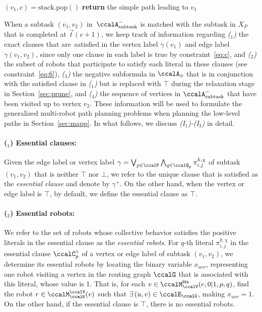 \documentclass[Afour,sageh,times]{sagej}
\newcounter{mycounter}
\newcommand{\clause}[1]{\mathsf{cls}(#1)}
\newcommand{\auto}[1]{\ccalA_{\textup{#1}}}
\newcommand{\autop}{\ccalA_{\phi}}
\renewcommand{\ap}[3]{\mathcal{\pi}_{{#1},{#2}}^{#3}}
\begin{document}
{{\begin{algorithm}[t]
{{{             }
           }
           $(v_1, c) = \text{stack.pop}()$\;
           }
           {\bf return} the simple path leading to $v_1$\;

 \end{algorithm}
 When a subtask $(v_1, v_2)$ in~$\auto{subtask}^-$ is matched with the subtask in $X_P$ that is completed at $\vec{t}(c+1)$, we keep track of information regarding {\it ($_1$)} the exact clauses that are\ satisfied in the vertex label $\gamma(v_1)$  and edge label $\gamma(v_1, v_2)$, since only one clause in each label is true by constraint~\eqref{eq:c}, and {\it ($_2$)} the subset of robots that participate to satisfy each literal in these clauses (see constraint~\eqref{eq:6}),
 {\it ($_3$)} the negative subformula in $\autop$ that is in conjunction  with the satisfied clause in {\it ($_1$)} but is replaced with $\top$ during the relaxation stage in Section~\ref{sec:prune}, and  {\it ($_4$)} the sequence of vertices in $\auto{subtask}^-$ that have been visited up to vertex $v_2$. These information will be used to formulate the generalized multi-robot path planning problems when planning the low-level paths in Section~\ref{sec:mapp}. In what follows, we discuss {\it (I$_1$)-(I$_3$)} in detail.

   \paragraph{($_1$) Essential clauses:} Given the edge label or vertex label $\gamma=\bigvee_{p\in \ccalP} \bigwedge_{q\in \ccalQ_p} \ap{i}{j}{k,\chi}$ of subtask $(v_1, v_2)$ that is neither $\top$ nor $\bot$, we refer to the unique clause that is satisfied as the {\it essential clause} and denote by $\gamma^+$. %
On the other hand, when the vertex or edge label is $\top$, by default, we define the essential clause as $\top$.
   \paragraph{($_2$) Essential robots:} We refer to the set of robots whose collective behavior satisfies the positive literals in the essential clause as the {\it essential robots}. For $q$-th literal $\ap{i}{j}{k,\chi}$ in the essential clause $\ccalC_p^\gamma$ of a vertex or edge label of subtask $(v_1, v_2)$, we determine its essential robots by locating the binary variable $x_{uvr}$, representing one robot visiting a vertex in the routing graph $\ccalG$ that is associated with this literal, whose value is 1. That is, for each $v\in \ccalM_{\ccalV}^\mathsf{lits} (e, 0|1, p, q)$, find the robot $r\in \ccalM_\ccalK^\ccalV(v)$ such that $\exists\, (u,v)\in\ccalE_\ccalG$, making $x_{uvr}=1$.  On the other hand, if the essential clause is $\top$, there is no essential robots.
}}
\end{document}
